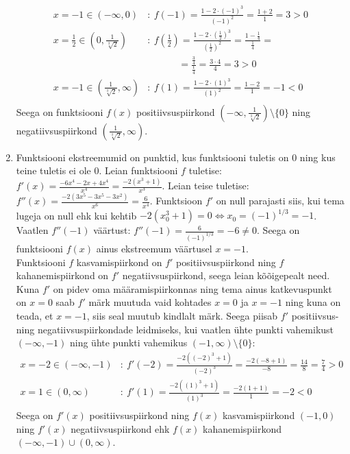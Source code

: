 \documentclass{article}
\begin{document}
\begin{enumerate}
\begin{equation*}
	\begin{aligned}
	x=-1\in(-\infty,0)&:\ f(-1)=\frac{1-2\cdot(-1)^3}{(-1)^2}=\frac{1+2}{1}=3>0\\
	x=\frac{1}{2}\in(0,\frac{1}{\sqrt[3]{2}})&:\ f\left(\frac{1}{2}\right)=\frac{1-2\cdot(\frac{1}{2})^3}{(\frac{1}{2})^2}=\frac{1-\frac{1}{4}}{\frac{1}{4}}=\\
	&\qquad\quad\ =\frac{\frac{3}{4}}{\frac{1}{4}}=\frac{3\cdot4}{4}=3>0\\
	x=-1\in(\frac{1}{\sqrt[3]{2}},\infty)&:\ f(1)=\frac{1-2\cdot(1)^3}{(1)^2}=\frac{1-2}{1}=-1<0\\
	\end{aligned}
	\end{equation*}
	Seega on funktsiooni $f(x)$ positiivsuspiirkond $(-\infty,\frac{1}{\sqrt[3]{2}})\setminus\{0\}$ ning negatiivsuspiirkond $(\frac{1}{\sqrt[3]{2}},\infty)$.
	\item Funktsiooni ekstreemumid on punktid, kus funktsiooni tuletis on 0 ning kus teine tuletis ei ole 0. Leian funktsiooni $f$ tuletise: $f'(x)=\displaystyle\frac{-6x^4-2x+4x^4}{x^4}=\frac{-2(x^3+1)}{x^3}$. Leian teise tuletise: $f''(x)=\displaystyle\frac{-2(3x^5-3x^5-3x^2)}{x^6}=\frac{6}{x^4}$. Funktsioon $f'$ on null parajasti siis, kui tema lugeja on null ehk kui kehtib $-2(x_0^3+1)=0\Leftrightarrow x_0=(-1)^{1/3}=-1$. Vaatlen $f''(-1)$ v\"a\"artust: $f''(-1)=\frac{6}{(-1)^{1/3}}=-6\neq0$. Seega on funktsiooni $f(x)$ ainus ekstreemum v\"a\"artusel $x=-1$.\\
	Funktsiooni $f$ kasvamispiirkond on $f'$ positiivsuspiirkond ning $f$ kahanemispiirkond on $f'$ negatiivsuspiirkond, seega leian kõ\~oigepealt need. Kuna $f'$ on pidev oma m\"a\"aramispiirkonnas ning tema ainus katkevuspunkt on $x=0$ saab $f'$ m\"ark muutuda vaid kohtades $x=0$ ja $x=-1$ ning kuna on teada, et $x=-1$, siis seal muutub kindlalt m\"ark. Seega piisab $f'$ positiivsus- ning negatiivsuspiirkondade leidmiseks, kui vaatlen \"uhte punkti vahemikust $(-\infty, -1)$ ning \"uhte punkti vahemikus $(-1,\infty)\setminus\{0\}$:
	\begin{equation*}
	\begin{aligned}
	x=-2\in(-\infty,-1)&:\ f'(-2)=\frac{-2((-2)^3+1)}{(-2)^3}=\frac{-2(-8+1)}{-8}=\frac{14}{8}=\frac{7}{4}>0\\
	x=1\in(0,\infty)&:\ f'(1)=\frac{-2((1)^3+1)}{(1)^3}=\frac{-2(1+1)}{1}=-2<0\\
	\end{aligned}
	\end{equation*}
	Seega on $f'(x)$ positiivsuspiirkond ning $f(x)$ kasvamispiirkond $(-1,0)$ ning $f'(x)$ negatiivsuspiirkond ehk $f(x)$ kahanemispiirkond $(-\infty,-1)\cup(0,\infty)$.

\end{enumerate}
\end{document}
